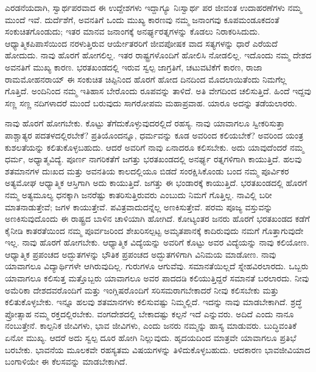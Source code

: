 \vskip   5pt

ಎರಡನೆಯದಾಗಿ, ಸ್ವಾರ್ಥಪರವಾದ ಈ ಉದ್ದೇಶಗಳು ಇದ್ದಾಗ್ಯೂ ನಿಃಸ್ವಾರ್ಥ ಪರ ಜೀವಂತ ಉದಾಹರಣೆಗಳು ನಮ್ಮ ಮುಂದೆ ಇವೆ. ದುರ್ದೆಶೆಗೆ, ಅವನತಿಗೆ ಒಂದು ಮುಖ್ಯ ಕಾರಣವು ನಮ್ಮ ಜನಾಂಗವು ಕೂಪಮಂಡೂಕದಂತೆ ಸಂಕುಚಿತಗೊಂಡುದು; ಇತರ ಮಾನವ ಜನಾಂಗಕ್ಕೆ ಅನರ್ಘ್ಯರತ್ನಗಳನ್ನು ಕೊಡಲು ನಿರಾಕರಿಸಿದುದು. ಆಧ್ಯಾತ್ಮಿಕ\break ಪಿಪಾಸೆಯಿಂದ ನರಳುತ್ತಿರುವ ಆರ್ಯೇತರರಿಗೆ ಜೀವಪೋಷಕ ವಾದ ಸತ್ಯಗಳನ್ನು ಧಾರೆ ಎರೆಯದೆ ಹೋದುದು. ನಾವು ಹೊರಗೆ ಹೋಗಲಿಲ್ಲ. ಇತರ ರಾಷ್ಟ್ರಗಳೊಂದಿಗೆ ಹೋಲಿಸಿ ನೋಡಲಿಲ್ಲ. ಇದೊಂದು ನಮ್ಮ ದೇಶದ ಅವನತಿಗೆ ಮುಖ್ಯ ಕಾರಣ. ಭರತಖಂಡದಲ್ಲಿ ಇರುವ ಸ್ವಲ್ಪ ಜಾಗ್ರತಿಗೆ, ಚಟುವಟಿಕೆಗೆ ಕಾರಣ, ರಾಜಾ ರಾಮಮೋಹನರಾಯ್​ ಈ ಸಂಕುಚಿತ ಚಿಪ್ಪಿನಿಂದ ಹೊರಗೆ ಹೋದ ದಿನದಿಂದ ಮೊದಲಾಯಿತೆಂದು ನಿಮಗೆಲ್ಲ ಗೊತ್ತಿದೆ. ಅಂದಿನಿಂದ ನಮ್ಮ ಇತಿಹಾಸ ಬೇರೊಂದು ರೂಪವನ್ನು ತಾಳಿದೆ. ಅತಿ ವೇಗದಿಂದ ಚಲಿಸುತ್ತಿದೆ. ಹಿಂದೆ ಇದ್ದವು ಸಣ್ಣ ಸಣ್ಣ ನದಿಗಳಾದರೆ ಮುಂದೆ ಬರುವುದು ಸಾಗರೋಪಮ ಮಹಾಪ್ರವಾಹ. ಯಾರೂ ಅದನ್ನು ತಡೆಯಲಾರರು.

\vskip   4pt

ನಾವು ಹೊರಗೆ ಹೋಗಬೇಕು. ಕೊಟ್ಟು ತೆಗೆದುಕೊಳ್ಳುವುದರಲ್ಲಿದೆ ರಹಸ್ಯ. ನಾವು ಯಾವಾಗಲೂ ಸ್ವೀಕರಿಸುತ್ತಾ ಪಾಶ್ಚಾತ್ಯರ ಪದತಳದಲ್ಲಿರಬೇಕೆ? ಪ್ರತಿಯೊಂದನ್ನೂ, ಧರ್ಮವನ್ನು ಕೂಡ ಅವರಿಂದ ಕಲಿಯಬೇಕೆ? ಅವರಿಂದ ಯಂತ್ರ ಕುಶಲತೆಯನ್ನು ಕಲಿತುಕೊಳ್ಳಬಹುದು. ಆದರೆ ಅವರಿಗೆ ನಾವು ಏನಾದರೂ ಕಲಿಸಬೇಕು. ಅದು ಯಾವುದೆಂದರೆ ನಮ್ಮ ಧರ್ಮ, ಅಧ್ಯಾತ್ಮವಿದ್ಯೆ. ಪೂರ್ಣ ನಾಗರಿಕತೆಗೆ ಜಗತ್ತು ಭರತಖಂಡದಲ್ಲಿ ಅನರ್ಘ್ಯ ರತ್ನಗಳಿಗಾಗಿ ಕಾಯುತ್ತಿದೆ. ಹಲವು ಶತಮಾನಗಳ ದುಃಖದ ಮತ್ತು ಅವನತಿಯ ಕಾಲದಲ್ಲಿಯೂ ಬಿಡದೆ ಸಂರಕ್ಷಿಸಿಕೊಂಡು ಬಂದ ನಮ್ಮ ಪೂರ್ವಿಕರ ಅತ್ಯಮೋಘ ಆಧ್ಯಾತ್ಮಿಕ ಆಸ್ತಿಗಾಗಿ ಅದು ಕಾಯುತ್ತಿದೆ. ಜಗತ್ತು ಈ ಭಂಡಾರಕ್ಕೆ ಕಾಯುತ್ತಿದೆ. ಭರತಖಂಡದಲ್ಲಿ ಹೊರಗೆ ನಮ್ಮ ಅತ್ಯಮೂಲ್ಯ ಧನಕ್ಕಾಗಿ ಜನರೆಷ್ಟು ಕಾತರಿಸುತ್ತಿರುವರು ಎಂಬುದು ನಿಮಗೆ ಗೊತ್ತಿಲ್ಲ. ನಾವಿಲ್ಲಿ ಬರೀ ಮಾತನಾಡುತ್ತೇವೆ; ಜಗಳ ಕಾಯುತ್ತೇವೆ. ಪವಿತ್ರವಾದುದನ್ನೆಲ್ಲ ಅಣಕಿಸುತ್ತೇವೆ. ಪರಮ ಪೂಜ್ಯ ವಸ್ತುವನ್ನು ಅಣಕಿಸುವುದೊಂದು ಈ ರಾಷ್ಟ್ರದ ಬಾಳಿನ ಚಾಳಿಯಾಗಿ ಹೋಗಿದೆ. ಕೋಟ್ಯಂತರ ಜನರು ಹೊರಗೆ ಭರತಖಂಡದ ಕಡೆಗೆ ಕೈನೀಡಿ ಕಾತರತೆಯಿಂದ ನಮ್ಮ ಪೂರ್ವಜರಿಂದ ಶೇಖರಿಸಲ್ಪಟ್ಟ ಅಮೃತಪಾನಕ್ಕೆ ಕಾದಿರುವುದು ನಮಗೆ ಗೊತ್ತಾಗುವುದೇ ಇಲ್ಲ. ನಾವು ಹೊರಗೆ ಹೋಗಬೇಕು. ಆಧ್ಯಾತ್ಮಿಕ ವಿದ್ಯೆಯನ್ನು ಅವರಿಗೆ ಕೊಟ್ಟು ಅವರ ವಿದ್ಯೆಯನ್ನು ನಾವು ಕಲಿಯೋಣ. ಆಧ್ಯಾತ್ಮಿಕ ಪ್ರಪಂಚದ ಅದ್ಭುತಗಳನ್ನು ಭೌತಿಕ ಪ್ರಪಂಚದ ಅದ್ಭುತಗಳಿಗಾಗಿ ವಿನಿಮಯ ಮಾಡೋಣ. ನಾವು ಯಾವಾಗಲೂ ವಿದ್ಯಾರ್ಥಿಗಳೇ ಆಗಿರುವುದಿಲ್ಲ. ಗುರುಗಳೂ ಆಗುವೆವು. ಸಮಾನತೆಯಿಲ್ಲದೆ ಸ್ನೇಹವಿರಲಾರದು. ಒಬ್ಬರು ಯಾವಾಗಲೂ ಕಲಿಸುತ್ತ ಮತ್ತೊಬ್ಬರು ಯಾವಾಗಲೂ ಅವರ ಪಾದದಡಿ ಕಲಿಯುತ್ತಿದ್ದರೆ ಸಮಾನತೆ ಬರಲಾರದು. ನೀವು ಅಮೆರಿಕಾ ದೇಶದವರೊಂದಿಗೆ ಮತ್ತು ಇಂಗ್ಲಿಷರೊಂದಿಗೆ ಸರಿಸಮರಾಗಬೇಕಾದರೆ ನೀವು ಕಲಿಸಬೇಕು ಮತ್ತು ಕಲಿತುಕೊಳ್ಳಬೇಕು. ಇನ್ನೂ ಹಲವು ಶತಮಾನಗಳು ಕಲಿಸುವಷ್ಟು ನಿಮ್ಮಲ್ಲಿದೆ. ಇದನ್ನು ನಾವು ಮಾಡಬೇಕಾಗಿದೆ. ಶ್ರದ್ಧೆ ಪ್ರೋತ್ಸಾಹ ನಮ್ಮ ರಕ್ತದಲ್ಲಿರಬೇಕು. ವಂಗದೇಶದಲ್ಲಿ ಬೇಕಾದಷ್ಟು ಕಲ್ಪನೆ ಇದೆ ಎನ್ನುವರು. ಅದಿದೆ ಎಂದು ನಾನೂ ನಂಬುತ್ತೇನೆ. ಕಾಲ್ಪನಿಕ ಜೀವಿಗಳು, ಭಾವ ಜೀವಿಗಳು, ಎಂದು ಜನರು ನಮ್ಮನ್ನು ಹಾಸ್ಯ ಮಾಡುವರು. ಬುದ್ಧಿವಂತಿಕೆ ಏನೋ ಮುಖ್ಯ. ಆದರೆ ಅದು ಸ್ವಲ್ಪ ದೂರ ಹೋಗಿ ನಿಲ್ಲುವುದು. ಹೃದಯದಿಂದ ಮಾತ್ರವೇ ಯಾವಾಗಲೂ ಪ್ರತಿಭೆ ಬರಬೇಕು. ಭಾವನೆಯ ಮೂಲಕವೇ ರಹಸ್ಯತಮ ವಿಷಯಗಳನ್ನು ತಿಳಿದುಕೊಳ್ಳಬಹುದು. ಆದಕಾರಣ ಭಾವಜೀವಿಯಾದ ಬಂಗಾಳಿಯೇ ಈ ಕೆಲಸವನ್ನು ಮಾಡಬೇಕಾಗಿದೆ.

